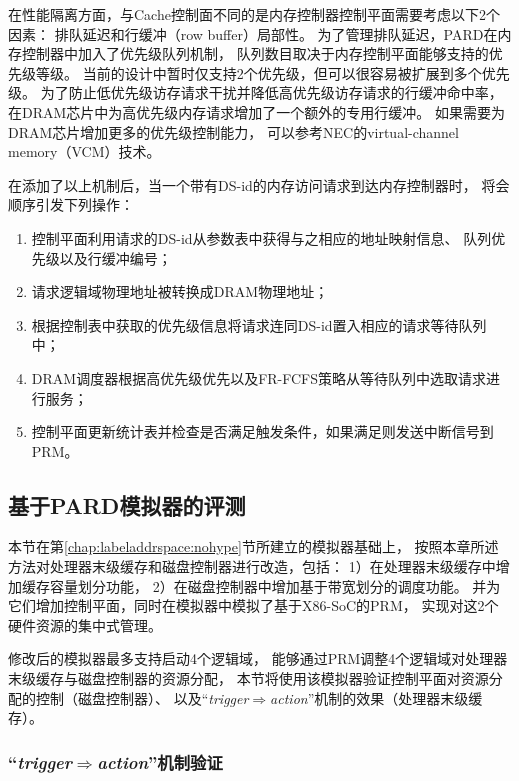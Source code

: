 在性能隔离方面，与Cache控制面不同的是内存控制器控制平面需要考虑以下2个因素：
排队延迟和行缓冲（row buffer）局部性。
为了管理排队延迟，PARD在内存控制器中加入了优先级队列机制，
队列数目取决于内存控制平面能够支持的优先级等级。
当前的设计中暂时仅支持2个优先级，但可以很容易被扩展到多个优先级。
为了防止低优先级访存请求干扰并降低高优先级访存请求的行缓冲命中率，
在DRAM芯片中为高优先级内存请求增加了一个额外的专用行缓冲。
如果需要为DRAM芯片增加更多的优先级控制能力，
可以参考NEC的virtual-channel memory（VCM）\cite{nec-vcm}技术。

在添加了以上机制后，当一个带有DS-id的内存访问请求到达内存控制器时，
将会顺序引发下列操作：

\begin{enumerate}[leftmargin=2\parindent, nolistsep, label=（\arabic*）]
  \item 控制平面利用请求的DS-id从参数表中获得与之相应的地址映射信息、
        队列优先级以及行缓冲编号；
  \item 请求逻辑域物理地址被转换成DRAM物理地址；
  \item 根据控制表中获取的优先级信息将请求连同DS-id置入相应的请求等待队列中；
  \item DRAM调度器根据高优先级优先以及FR-FCFS\cite{rixner_memory_2000}策略从等待队列中选取请求进行服务；
  \item 控制平面更新统计表并检查是否满足触发条件，如果满足则发送中断信号到PRM。
\end{enumerate}

\subsection{基于PARD模拟器的评测}

本节在第\ref{chap:labeladdrspace:nohype}节所建立的模拟器基础上，
按照本章所述方法对处理器末级缓存和磁盘控制器进行改造，包括：
1）在处理器末级缓存中增加缓存容量划分功能，
2）在磁盘控制器中增加基于带宽划分的调度功能。
并为它们增加控制平面，同时在模拟器中模拟了基于X86-SoC的PRM，
实现对这2个硬件资源的集中式管理。

修改后的模拟器最多支持启动4个逻辑域，
能够通过PRM调整4个逻辑域对处理器末级缓存与磁盘控制器的资源分配，
本节将使用该模拟器验证控制平面对资源分配的控制（磁盘控制器）、
以及``\emph{trigger$\Rightarrow$action}''机制的效果（处理器末级缓存）。


\subsubsection{``\emph{trigger$\Rightarrow$action}''机制验证}

